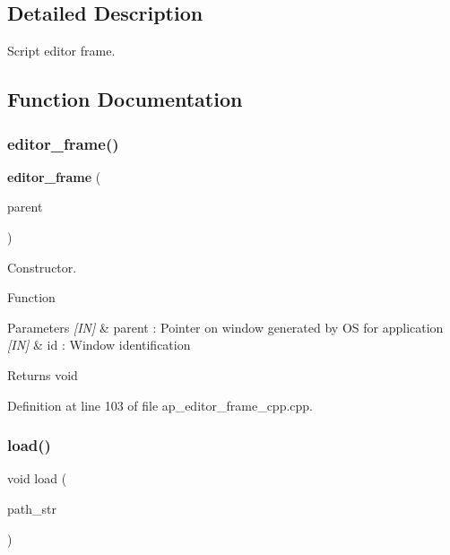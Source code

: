 \subsection{Detailed Description}
Script editor frame. 



\subsection{Function Documentation}
\mbox{\label{group___script__editor_ga6cdc1985f09711accb338c7345c7209d}} 
\subsubsection{editor\_frame()}
{\footnotesize\ttfamily \textbf{ editor\+\_\+frame} (\begin{DoxyParamCaption}\item[{wx\+Window $\ast$}]{parent }\end{DoxyParamCaption})}



Constructor. 

Function
\begin{DoxyParams}{Parameters}
{\em \mbox{[}\+I\+N\mbox{]}} & parent \+: Pointer on window generated by OS for application \\
\hline
{\em \mbox{[}\+I\+N\mbox{]}} & id \+: Window identification \\
\hline
\end{DoxyParams}
\begin{DoxyReturn}{Returns}
void 
\end{DoxyReturn}


Definition at line 103 of file ap\+\_\+editor\+\_\+frame\+\_\+cpp.\+cpp.

\mbox{\label{group___script__editor_ga8caf41718ffb5bf060de703f18f72546}} 
\subsubsection{load()}
{\footnotesize\ttfamily void load (\begin{DoxyParamCaption}\item[{wx\+String}]{path\+\_\+str }\end{DoxyParamCaption})}




